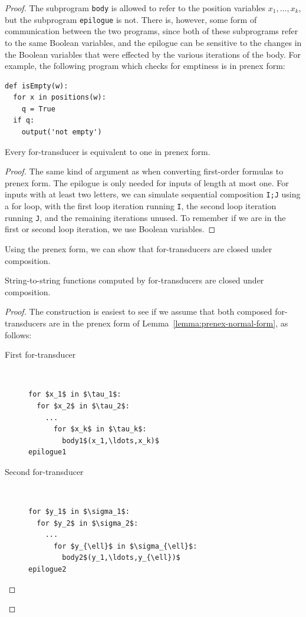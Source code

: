 \begin{proof}
The subprogram {\tt body} is allowed to refer to the position variables $x_1,\ldots,x_k$, but the subprogram {\tt epilogue} is not. There is, however, some form of communication between the two programs, since both of these subprograms refer to the same Boolean variables, and the epilogue can be sensitive to the changes in the Boolean variables that were effected by the various iterations of the body. For example, the following program which checks for emptiness is in prenex  form: 
\begin{lstlisting}
def isEmpty(w):
  for x in positions(w):
    q = True
  if q:
    output('not empty')
\end{lstlisting}

        \begin{lemma}\label{lemma:prenex-normal-form}
            Every for-transducer is equivalent to one in prenex  form.
        \end{lemma}

        \begin{proof}
            The same kind of argument as when converting first-order formulas to prenex  form. The epilogue is only needed for inputs of length at most one. For inputs with at least two letters, we can simulate  sequential composition \texttt{I;J} using a for loop, with the first loop iteration running \texttt{I}, the second loop iteration running \texttt{J}, and the remaining iterations unused. To remember if we are in the first or second loop iteration, we use Boolean variables.
        \end{proof}

    Using the prenex  form, we can show that for-transducers are closed under composition.

\begin{lemma}\label{lem:for-closed-under-composition}
    String-to-string functions computed by for-transducers are closed under composition.
\end{lemma}

\begin{proof}
    The construction is easiest to see if we assume that both composed for-transducers are in the prenex  form of Lemma~\ref{lemma:prenex-normal-form}, as follows:
\begin{description}
  \item[First for-transducer] \ 
    \begin{lstlisting}
for $x_1$ in $\tau_1$:
  for $x_2$ in $\tau_2$:
    ...
      for $x_k$ in $\tau_k$:
        body1$(x_1,\ldots,x_k)$
epilogue1
            \end{lstlisting}
            \item[Second for-transducer] \ 
\begin{lstlisting}
for $y_1$ in $\sigma_1$:
  for $y_2$ in $\sigma_2$:
    ...
      for $y_{\ell}$ in $\sigma_{\ell}$:
        body2$(y_1,\ldots,y_{\ell})$
epilogue2
            \end{lstlisting}
            \end{description}    
    

\end{proof}
\end{proof}
